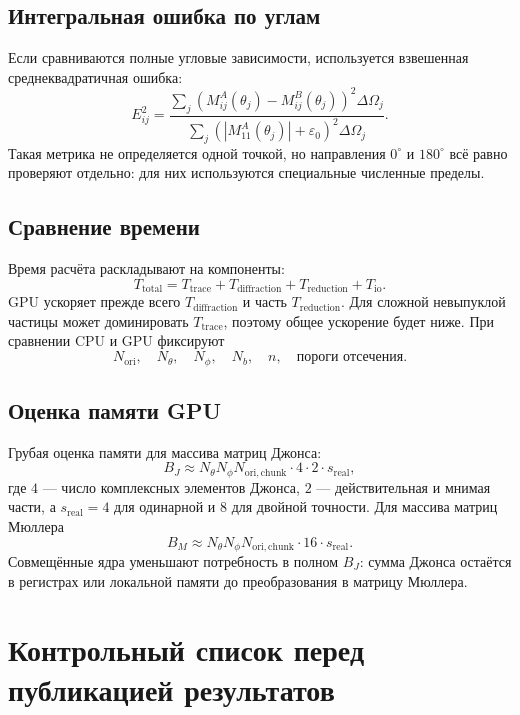 \documentclass[11pt,a4paper]{article}
\begin{document}
\subsection{Интегральная ошибка по углам}

Если сравниваются полные угловые зависимости, используется взвешенная
среднеквадратичная ошибка:
\[
  E_{ij}^{2}=
  \frac{
  \sum_j
  \left(M^{A}_{ij}(\theta_j)-M^{B}_{ij}(\theta_j)\right)^2
  \Delta\Omega_j
  }{
  \sum_j
  \left(|M^{A}_{11}(\theta_j)|+\varepsilon_0\right)^2
  \Delta\Omega_j
  }.
\]
Такая метрика не определяется одной точкой, но направления $0^\circ$ и
$180^\circ$ всё равно проверяют отдельно: для них используются специальные
численные пределы.

\subsection{Сравнение времени}

Время расчёта раскладывают на компоненты:
\[
  T_{\mathrm{total}}=
  T_{\mathrm{trace}}+
  T_{\mathrm{diffraction}}+
  T_{\mathrm{reduction}}+
  T_{\mathrm{io}}.
\]
GPU ускоряет прежде всего $T_{\mathrm{diffraction}}$ и часть
$T_{\mathrm{reduction}}$. Для сложной невыпуклой частицы может доминировать
$T_{\mathrm{trace}}$, поэтому общее ускорение будет ниже. При сравнении CPU и
GPU фиксируют
\[
  N_{\mathrm{ori}},\quad N_{\theta},\quad N_{\phi},\quad N_b,\quad n,
  \quad \text{пороги отсечения}.
\]

\subsection{Оценка памяти GPU}

Грубая оценка памяти для массива матриц Джонса:
\[
  B_J \approx
  N_{\theta}N_{\phi}N_{\mathrm{ori,chunk}}
  \cdot 4 \cdot 2 \cdot s_{\mathrm{real}},
\]
где $4$ --- число комплексных элементов Джонса, $2$ --- действительная и
мнимая части, а $s_{\mathrm{real}}=4$ для одинарной и $8$ для двойной
точности. Для массива матриц Мюллера
\[
  B_M \approx
  N_{\theta}N_{\phi}N_{\mathrm{ori,chunk}}
  \cdot 16 \cdot s_{\mathrm{real}}.
\]
Совмещённые ядра уменьшают потребность в полном $B_J$: сумма Джонса остаётся в
регистрах или локальной памяти до преобразования в матрицу Мюллера.

\clearpage
\section{Контрольный список перед публикацией результатов}
\end{document}
